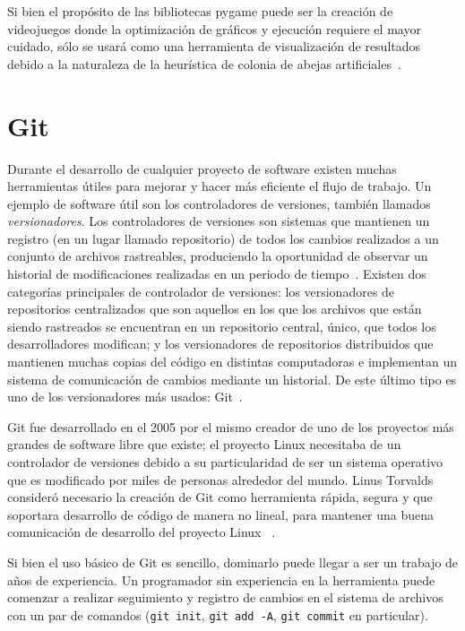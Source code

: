 Si bien el propósito de las bibliotecas pygame puede ser la creación de 
videojuegos donde la optimización de gráficos y ejecución requiere el mayor 
cuidado, sólo se usará como una herramienta de visualización de resultados debido 
a la naturaleza de la heurística de colonia de abejas artificiales~\cite{pygame}.



\section{Git}

Durante el desarrollo de cualquier proyecto de software existen muchas herramientas útiles para
mejorar y hacer más eficiente el flujo de trabajo. Un ejemplo de software útil son
los controladores de versiones, también llamados \textit{versionadores}.
Los controladores de versiones son sistemas que
mantienen un registro (en un lugar llamado repositorio) de todos los cambios
realizados a un conjunto de archivos rastreables, produciendo la oportunidad de
observar un historial de modificaciones realizadas en un periodo de
tiempo~\cite{git-about}. Existen dos categorías principales de controlador de
versiones: los versionadores de repositorios centralizados que son aquellos en los que los
archivos que están siendo rastreados se encuentran en un repositorio central,
único, que todos los desarrolladores modifican; y los versionadores de repositorios
distribuidos que mantienen muchas copias del código en distintas computadoras e
implementan un sistema de comunicación de cambios mediante un historial. De este
último tipo es uno de los versionadores más usados: Git~\cite{scopatz2015effective}.

Git fue desarrollado en el 2005 por el mismo creador de uno de los proyectos más
grandes de software libre que existe; el proyecto Linux necesitaba de un controlador de
versiones debido a su particularidad de ser un sistema operativo que es
modificado por miles de personas alrededor del mundo. Linus Torvalds
consideró necesario la creación de Git como herramienta rápida, segura y que
soportara desarrollo de código de manera no lineal, para mantener una buena
comunicación de desarrollo del proyecto Linux~\cite{git-about2} \cite{git-commit}.

Si bien el uso básico de Git es sencillo, dominarlo puede llegar a ser un
trabajo de años de experiencia. Un programador sin experiencia en la herramienta
puede comenzar a realizar seguimiento y registro de cambios en el sistema de
archivos con un par de comandos (\texttt{git init}, \texttt{git add -A},
\texttt{git commit} en particular).

